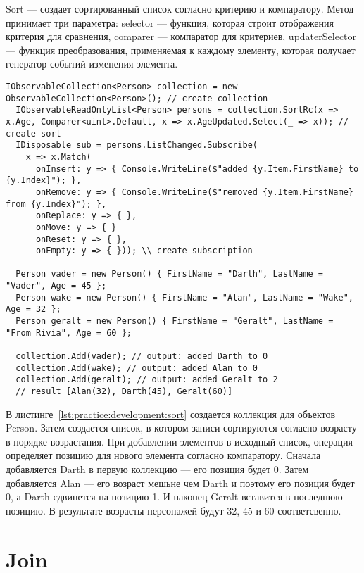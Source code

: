 Sort --- создает сортированный список согласно критерию и компаратору.
Метод принимает три параметра: selector --- функция, которая строит отображения критерия для сравнения, comparer --- компаратор для критериев,
updaterSelector --- функция преобразования, применяемая к каждому элементу, которая получает генератор событий изменения элемента.

\begin{lstlisting}[style=csharpinlinestyle, caption={Пример использования Sort}, label=lst:practice:development:sort]
  IObservableCollection<Person> collection = new ObservableCollection<Person>(); // create collection
  IObservableReadOnlyList<Person> persons = collection.SortRc(x => x.Age, Comparer<uint>.Default, x => x.AgeUpdated.Select(_ => x)); // create sort
  IDisposable sub = persons.ListChanged.Subscribe(
    x => x.Match(
      onInsert: y => { Console.WriteLine($"added {y.Item.FirstName} to {y.Index}"); },
      onRemove: y => { Console.WriteLine($"removed {y.Item.FirstName} from {y.Index}"); },
      onReplace: y => { },
      onMove: y => { }
      onReset: y => { },
      onEmpty: y => { })); \\ create subscription

  Person vader = new Person() { FirstName = "Darth", LastName = "Vader", Age = 45 };
  Person wake = new Person() { FirstName = "Alan", LastName = "Wake", Age = 32 };
  Person geralt = new Person() { FirstName = "Geralt", LastName = "From Rivia", Age = 60 };

  collection.Add(vader); // output: added Darth to 0
  collection.Add(wake); // output: added Alan to 0
  collection.Add(geralt); // output: added Geralt to 2
  // result [Alan(32), Darth(45), Geralt(60)]
\end{lstlisting}

В листинге~\ref{lst:practice:development:sort} создается коллекция для объектов Person. Затем создается список, в котором записи сортируются согласно возрасту в порядке возрастания.
При добавлении элементов в исходный список, операция определяет позицию для нового элемента согласно компаратору.
Сначала добавляется Darth в первую коллекцию --- его позиция будет 0. Затем добавляется Alan --- его возраст мешьне чем Darth и поэтому его позиция будет 0, а Darth сдвинется на позицию 1.
И наконец Geralt вставится в последнюю позицию. В результате возрасты персонажей будут 32, 45 и 60 соответсвенно.

\section{Join}
\label{sub:development:join}


